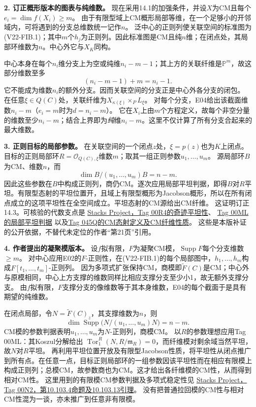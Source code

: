 \noindent\textbf{2. 订正概形版本的图表与纯维数。}
现在采用14.1的加强条件，并设$X$为CM且每个$e_i=\dim f(X_i)\geq m$。
由于有限型域上CM概形局部等维，在一个足够小的开邻域内，可将遇到的分支总维数统一记作$n$。
泛中心的正则列使关联空间的标准图为(V22-FIB.1)；其中$m$个$h_j$为正则列。因此标准图是CM且纯$n$维；在闭点处，其局部环维数为$n$。中心外它与$X_K$同构。

中心本身在每个$n_i$维分支上为空或纯维$n_i-m-1$；其上方的关联纤维是$\mathbb P^m$，故这部分维数至多
\[
(n_i-m-1)+m=n_i-1.
\]
它不能成为维数$n_i$的额外分支。因而关联空间的分支正是中心外各分支的闭包。
在任意$\xi\in Q(C)$处，关联纤维为$X_{\kappa(\xi)}\times_P L_\xi$。
对每个分支，E04给出该截面维数$n_i-m$（$e_i=m$时为$d=n_i-m$）。
它在$X_i$上由$m$个方程定义，故每个非空分量的维数至少$n_i-m$；结合上界即为\emph{纯}维$n_i-m$。这里不仅计算了所有分支合起来的最大维数。

\noindent\textbf{3. 正则目标的局部参数。}
在关联空间的一个闭点$z$处，$\xi=p(z)$也为$K$上闭点。目标的正则局部环$R=\mathcal O_{Q(C),\xi}$维数$m$；取其一组正则参数$u_1,\ldots,u_m$。
源局部环$B$为CM、维数$n$，而
\[
\dim B/(u_1,\ldots,u_m)B=n-m.
\]
因此这些参数在$B$中构成正则列，商仍CM。逐次应用局部平坦判据，即得$B$对$R$平坦。有限型态射的平坦位置开，且域上有限型概形为Jacobson概形，所以在所有闭点成立的这项平坦性在全空间成立。平坦态射的CM源给出CM纤维。
这证明订正14.3。可核验的代数支点是
\href{https://stacks.math.columbia.edu/tag/00R4}{Stacks Project，Tag 00R4的奇迹平坦性}、
\href{https://stacks.math.columbia.edu/tag/00ML}{Tag 00ML的局部平坦判据}
以及\href{https://stacks.math.columbia.edu/tag/045Q}{Tag 045Q的CM态射定义及CM纤维性质}。
这些是本版补证的公开依据，不替代未定位的作者“第21页”引用。

\noindent\textbf{4. 作者提出的凝聚模版本。}
设$f$拟有限，$F$为凝聚CM模，$\operatorname{Supp}F$每个分支维数$\geq m$。
对中心应用E02的$F$-正则性，在(V22-FIB.1)的每个局部图中，$h_1,\ldots,h_m$构成$F[t_1,\ldots,t_m]$-正则列。
因为多项式扩张保持CM，商模即$\widetilde F(C)$是CM；中心外与原模相同，中心上方支撑的维数同样比相应支撑分支至少小1，故无额外支撑分支。
由$f$拟有限，$F$支撑分支的像维数等于其本身维数，E04的每个截面于是具有期望的纯维数。

在闭点局部，令$N=\widetilde F(C)_z$，其支撑维数为$n$，则
\[
\dim\operatorname{Supp}\bigl(N/(u_1,\ldots,u_m)N\bigr)=n-m.
\]
CM模的参数判据表明$u_1,\ldots,u_m$为$N$-正则列，商模CM。
以$R$的参数理想应用Tag 00ML：其Koszul分解给出
$\operatorname{Tor}_1^R(N,R/\mathfrak m_R)=0$，而纤维模对剩余域当然平坦，故$N$对$R$平坦。
再利用平坦位置开放及有限型Jacobson性质，将平坦性从闭点推广到所有点。在任意一点，目标正则局部环的一组参数因该平坦性而在相应有限模上构成正则列；总模CM，故参数商也为CM。这才给出各纤维模的CM性，从而得到相对CM性。
这里用到的有限模CM参数判据及多项式稳定性见
\href{https://stacks.math.columbia.edu/tag/00N2}{Stacks Project，Tag 00N2，第10.103.4命题及10.103.13引理}。
没有把普通拉回模的CM性与相对CM性混为一谈，亦未推广到任意非有限模。

